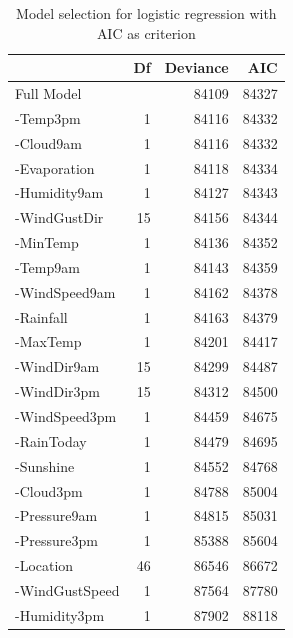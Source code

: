 \documentclass[11pt, a4paper, jou]{apa7}
\begin{document}
\begin{table}[p]
    \centering
    \caption{Model selection for logistic regression with AIC as criterion}
    \label{tab:model_selection_aic}
    \begin{tabular}{lrrr}
    \hline
                   & Df & Deviance & AIC                          \\ \hline
    Full Model     &    & 84109    & {\color[HTML]{FE0000} 84327} \\
    -Temp3pm       & 1  & 84116    & 84332                        \\
    -Cloud9am      & 1  & 84116    & 84332                        \\
    -Evaporation   & 1  & 84118    & 84334                        \\
    -Humidity9am   & 1  & 84127    & 84343                        \\
    -WindGustDir   & 15 & 84156    & 84344                        \\
    -MinTemp       & 1  & 84136    & 84352                        \\
    -Temp9am       & 1  & 84143    & 84359                        \\
    -WindSpeed9am  & 1  & 84162    & 84378                        \\
    -Rainfall      & 1  & 84163    & 84379                        \\
    -MaxTemp       & 1  & 84201    & 84417                        \\
    -WindDir9am    & 15 & 84299    & 84487                        \\
    -WindDir3pm    & 15 & 84312    & 84500                        \\
    -WindSpeed3pm  & 1  & 84459    & 84675                        \\
    -RainToday     & 1  & 84479    & 84695                        \\
    -Sunshine      & 1  & 84552    & 84768                        \\
    -Cloud3pm      & 1  & 84788    & 85004                        \\
    -Pressure9am   & 1  & 84815    & 85031                        \\
    -Pressure3pm   & 1  & 85388    & 85604                        \\
    -Location      & 46 & 86546    & 86672                        \\
    -WindGustSpeed & 1  & 87564    & 87780                        \\
    -Humidity3pm   & 1  & 87902    & 88118                        \\ \hline
    \end{tabular}
    \end{table}
    
\end{document}
